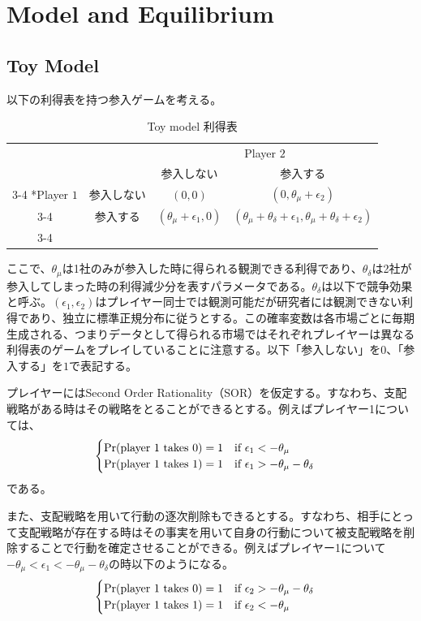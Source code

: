 \documentclass{jsarticle}
\begin{document}
\section{Model and Equilibrium}
\subsection{Toy Model}
以下の利得表を持つ参入ゲームを考える。
\begin{table}[h]
    \caption{Toy model 利得表}
    \centering
    \setlength{\extrarowheight}{2pt}
    \begin{tabular}{cc|c|c|}
      & \multicolumn{1}{c}{} & \multicolumn{2}{c}{Player $2$}\\
      & \multicolumn{1}{c}{} & \multicolumn{1}{c}{参入しない}  & \multicolumn{1}{c}{参入する} \\\cline{3-4}
      \multirow{2}*{Player $1$}  & 参入しない & $(0,0)$ & $(0,\theta_{\mu}+\epsilon_2)$ \\\cline{3-4}
      & 参入する & $(\theta_{\mu}+\epsilon_1,0)$ & $(\theta_{\mu}+\theta_{\delta}+\epsilon_1, \theta_{\mu}+\theta_{\delta}+\epsilon_2)$ \\\cline{3-4}
    \end{tabular}
\end{table}
ここで、$\theta_{\mu}$は1社のみが参入した時に得られる観測できる利得であり、$\theta_{\delta}$は2社が参入してしまった時の利得減少分を表すパラメータである。$\theta_{\delta}$は以下で競争効果と呼ぶ。$(\epsilon_1, \epsilon_2)$はプレイヤー同士では観測可能だが研究者には観測できない利得であり、独立に標準正規分布に従うとする。この確率変数は各市場ごとに毎期生成される、つまりデータとして得られる市場ではそれぞれプレイヤーは異なる利得表のゲームをプレイしていることに注意する。以下「参入しない」を$0$、「参入する」を$1$で表記する。

プレイヤーにはSecond Order Rationality（SOR）を仮定する。すなわち、支配戦略がある時はその戦略をとることができるとする。例えばプレイヤー1については、
\begin{align*}
	\begin{cases}
		{\rm Pr}(\text{player 1 takes $0$}) = 1\quad \text{if}\ \epsilon_1 < -\theta_{\mu}\\
		{\rm Pr}(\text{player 1 takes $1$}) = 1\quad \text{if}\ \epsilon_1 > -\theta_{\mu} - \theta_{\delta}
	\end{cases}
\end{align*}
である。

また、支配戦略を用いて行動の逐次削除もできるとする。すなわち、相手にとって支配戦略が存在する時はその事実を用いて自身の行動について被支配戦略を削除することで行動を確定させることができる。例えばプレイヤー1について$-\theta_{\mu} < \epsilon_1 < -\theta_{\mu} - \theta_{\delta}$の時以下のようになる。
\begin{align*}
	\begin{cases}
		{\rm Pr}(\text{player 1 takes $0$}) = 1\quad \text{if}\ \epsilon_2 > -\theta_{\mu} - \theta_{\delta}\\
		{\rm Pr}(\text{player 1 takes $1$}) = 1\quad \text{if}\ \epsilon_2 < -\theta_{\mu}
	\end{cases}
\end{align*}
\end{document}
